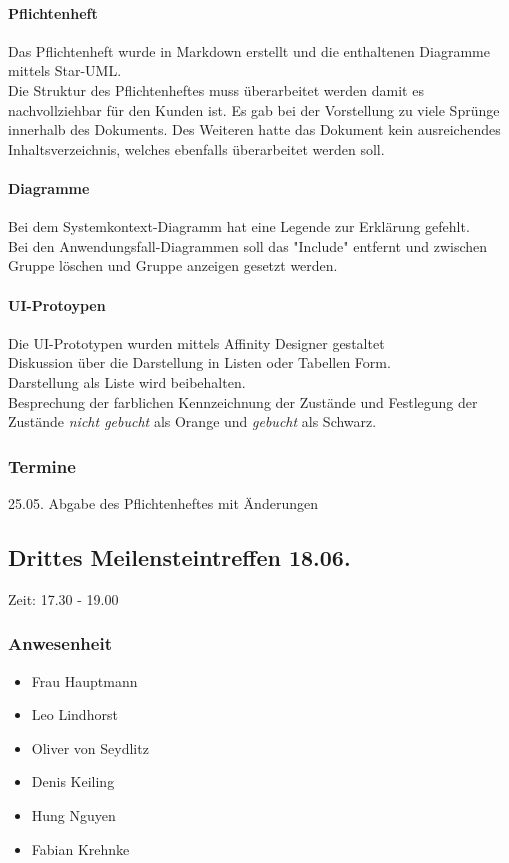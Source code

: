 \paragraph{Pflichtenheft}
Das Pflichtenheft wurde in Markdown erstellt und die enthaltenen
Diagramme mittels Star-UML.
\\Die Struktur des Pflichtenheftes muss überarbeitet werden damit es nachvollziehbar für den Kunden ist. Es gab bei der Vorstellung zu viele Sprünge innerhalb des Dokuments. Des Weiteren hatte das Dokument kein ausreichendes Inhaltsverzeichnis, welches ebenfalls überarbeitet werden soll.

\paragraph{Diagramme}
Bei dem Systemkontext-Diagramm hat eine Legende zur Erklärung gefehlt.
\\Bei den Anwendungsfall-Diagrammen soll das "Include" entfernt und zwischen Gruppe löschen und Gruppe anzeigen gesetzt werden.

\paragraph{UI-Protoypen}
Die UI-Prototypen wurden mittels Affinity Designer gestaltet
\\Diskussion über die Darstellung in Listen oder Tabellen Form.
\\Darstellung als Liste wird beibehalten.
\\Besprechung der farblichen Kennzeichnung der Zustände und Festlegung der Zustände \textit{nicht gebucht} als Orange und \textit{gebucht} als Schwarz.

\subsubsection{Termine}

25.05. Abgabe des Pflichtenheftes mit Änderungen


\subsection{Drittes Meilensteintreffen 18.06.}

Zeit: 17.30 - 19.00

\subsubsection{Anwesenheit}
\begin{itemize}
	\item Frau Hauptmann
	\item Leo Lindhorst
	\item Oliver von Seydlitz
	\item Denis Keiling
	\item Hung Nguyen
	\item Fabian Krehnke
\end{itemize}


